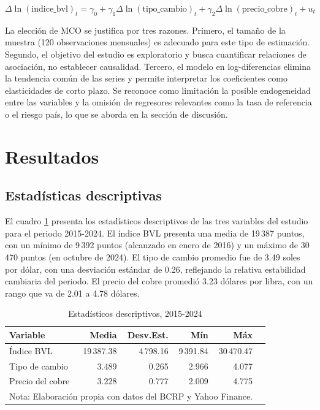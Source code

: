 \documentclass[12pt, a4paper]{article}
\begin{document}
\begin{equation}
\Delta \ln(\text{indice\_bvl})_t = \gamma_0 + \gamma_1 \Delta \ln(\text{tipo\_cambio})_t + \gamma_2 \Delta \ln(\text{precio\_cobre})_t + u_t
\end{equation}

La elección de MCO se justifica por tres razones. Primero, el tamaño de la muestra (120 observaciones mensuales) es adecuado para este tipo de estimación. Segundo, el objetivo del estudio es exploratorio y busca cuantificar relaciones de asociación, no establecer causalidad. Tercero, el modelo en log-diferencias elimina la tendencia común de las series y permite interpretar los coeficientes como elasticidades de corto plazo. Se reconoce como limitación la posible endogeneidad entre las variables y la omisión de regresores relevantes como la tasa de referencia o el riesgo país, lo que se aborda en la sección de discusión.

\section{Resultados}

\subsection{Estadísticas descriptivas}

El cuadro \ref{tab:desc} presenta los estadísticos descriptivos de las tres variables del estudio para el periodo 2015-2024. El índice BVL presenta una media de 19\,387 puntos, con un mínimo de 9\,392 puntos (alcanzado en enero de 2016) y un máximo de 30\,470 puntos (en octubre de 2024). El tipo de cambio promedio fue de 3.49 soles por dólar, con una desviación estándar de 0.26, reflejando la relativa estabilidad cambiaria del periodo. El precio del cobre promedió 3.23 dólares por libra, con un rango que va de 2.01 a 4.78 dólares.

\begin{table}[H]
\centering
\caption{Estadísticos descriptivos, 2015-2024}
\label{tab:desc}
\begin{tabular}{lrrrrr}
\toprule
Variable & Media & Desv.Est. & Mín & Máx \\
\midrule
Índice BVL & 19\,387.38 & 4\,798.16 & 9\,391.84 & 30\,470.47 \\
Tipo de cambio & 3.489 & 0.265 & 2.966 & 4.077 \\
Precio del cobre & 3.228 & 0.777 & 2.009 & 4.775 \\
\bottomrule
\multicolumn{5}{l}{\footnotesize Nota: Elaboración propia con datos del BCRP y Yahoo Finance.} \\
\end{tabular}
\end{table}
\end{document}
